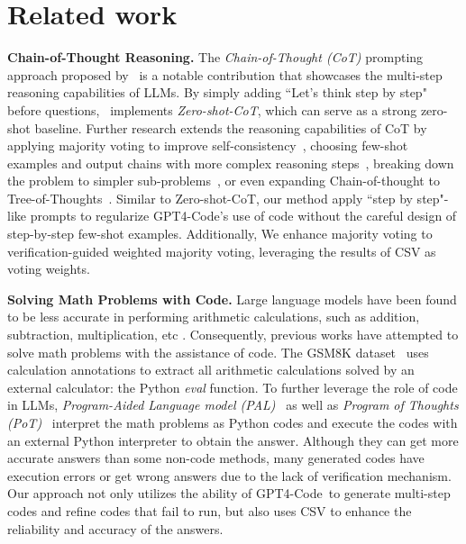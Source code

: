 \documentclass{article} \usepackage{iclr2023_conference,times}
\newcommand{\gptcode}{GPT4-Code}
\begin{document}
\section{Related work}


\textbf{Chain-of-Thought Reasoning.}
The \textit{Chain-of-Thought (CoT)} prompting approach proposed by~\citet{wei2022chain} is a notable contribution that showcases the multi-step reasoning capabilities of LLMs.
By simply adding “Let's think step by step" before questions,~\cite{NEURIPS2022_8bb0d291} implements \textit{Zero-shot-CoT}, which can serve as a strong zero-shot baseline. Further research extends the reasoning capabilities of CoT by applying majority voting to improve self-consistency~\citep{wang2023selfconsistency}, choosing few-shot examples and output chains with more complex reasoning steps~\citep{fu2022complexity}, breaking down the problem to simpler sub-problems~\citep{zhou2023leasttomost}, or even expanding Chain-of-thought to Tree-of-Thoughts~\citep{Yao2023TreeOT}. Similar to Zero-shot-CoT, our method apply  “step by step"-like prompts to regularize \gptcode's use of code without the careful design of step-by-step few-shot examples. Additionally, We enhance majority voting to verification-guided weighted majority voting, leveraging the results of CSV as voting weights.


\textbf{Solving Math Problems with Code.}
Large language models have been found to be less accurate in performing arithmetic calculations, such as addition, subtraction, multiplication, etc
\citep{cobbe2021gsm8k, lewkowycz2022solving, gao2023pal, lu2022dynamic}. Consequently, previous works have attempted to solve math problems with the assistance of code. The GSM8K dataset~\citep{cobbe2021gsm8k} uses calculation annotations to extract all arithmetic calculations solved by an external calculator: the Python \textit{eval} function. To further leverage the role of code in LLMs, \textit{Program-Aided Language model (PAL)}~\citep{gao2023pal} as well as \textit{Program of Thoughts (PoT)}~\citep{chen2022program} interpret the math problems as Python codes and execute the codes with an external Python interpreter to obtain the answer. 
Although they can get more accurate answers than some non-code methods, many generated codes have execution errors or get wrong answers due to the lack of verification mechanism. Our approach not only utilizes the ability of \gptcode~to generate multi-step codes and refine codes that fail to run, but also uses CSV to enhance the reliability and accuracy of the answers.
\end{document}
